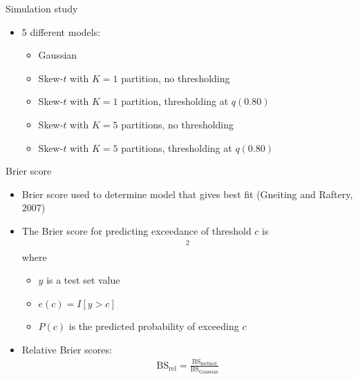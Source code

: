 \documentclass{beamer}
\begin{document}
\begin{frame}{Simulation study}
  \begin{itemize} \setlength{\itemsep}{0.5em}
    \item 5 different models:
    \begin{itemize}
      \item Gaussian
      \item Skew-$t$ with $K = 1$ partition, no thresholding
      \item Skew-$t$ with $K = 1$ partition, thresholding at $q(0.80)$
      \item Skew-$t$ with $K = 5$ partitions, no thresholding
      \item Skew-$t$ with $K = 5$ partitions, thresholding at $q(0.80)$
    \end{itemize}
  \end{itemize}
\end{frame}


\begin{frame}{Brier score}
  \begin{itemize} \setlength{\itemsep}{0.5em}
    \item Brier score used to determine model that gives best fit (Gneiting and Raftery, 2007)
    \item The Brier score for predicting exceedance of threshold $c$ is
    \begin{align*}
      [e(c) - P(c)]^2
    \end{align*}
    where
    \begin{itemize}
      \item $y$ is a test set value
      \item $e(c) = I[y > c]$
      \item $P(c)$ is the predicted probability of exceeding $c$
    \end{itemize}
    \item Relative Brier scores:
    \begin{align*}
      \text{BS}_\text{rel} = \frac{ \text{BS}_\text{method}}{ \text{BS}_\text{Gaussian}}
    \end{align*}
  \end{itemize}
\end{frame}
\end{document}
